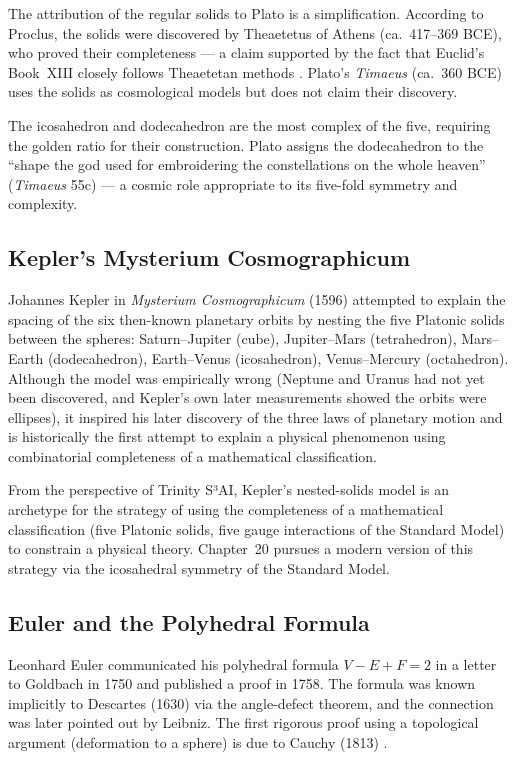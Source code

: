 The attribution of the regular solids to Plato is a simplification.
According to Proclus, the solids were discovered by Theaetetus of Athens
(ca.\ 417–369 BCE), who proved their completeness — a claim supported by the
fact that Euclid's Book~XIII closely follows Theaetetan methods \cite{cromwell_polyhedra}.
Plato's \emph{Timaeus} (ca.\ 360 BCE) uses the solids as cosmological models
but does not claim their discovery.

The icosahedron and dodecahedron are the most complex of the five, requiring
the golden ratio for their construction.  Plato assigns the dodecahedron to
the ``shape the god used for embroidering the constellations on the whole
heaven'' (\emph{Timaeus} 55c) — a cosmic role appropriate to its five-fold
symmetry and complexity.

\subsection{Kepler's Mysterium Cosmographicum}
\label{subsec:history-kepler}

Johannes Kepler in \emph{Mysterium Cosmographicum} (1596) attempted to explain
the spacing of the six then-known planetary orbits by nesting the five Platonic
solids between the spheres: Saturn–Jupiter (cube), Jupiter–Mars (tetrahedron),
Mars–Earth (dodecahedron), Earth–Venus (icosahedron), Venus–Mercury (octahedron).
Although the model was empirically wrong (Neptune and Uranus had not yet been
discovered, and Kepler's own later measurements showed the orbits were ellipses),
it inspired his later discovery of the three laws of planetary motion and is
historically the first attempt to explain a physical phenomenon using
combinatorial completeness of a mathematical classification.

From the perspective of Trinity S³AI, Kepler's nested-solids model is an
archetype for the strategy of using the completeness of a mathematical
classification (five Platonic solids, five gauge interactions of the Standard Model)
to constrain a physical theory.  Chapter~20 pursues a modern version of this
strategy via the icosahedral symmetry of the Standard Model.

\subsection{Euler and the Polyhedral Formula}
\label{subsec:history-euler}

Leonhard Euler communicated his polyhedral formula $V - E + F = 2$ in a letter
to Goldbach in 1750 and published a proof in 1758.  The formula was known
implicitly to Descartes (1630) via the angle-defect theorem, and the connection
was later pointed out by Leibniz.  The first rigorous proof using a topological
argument (deformation to a sphere) is due to Cauchy (1813) \cite{cromwell_polyhedra}.

